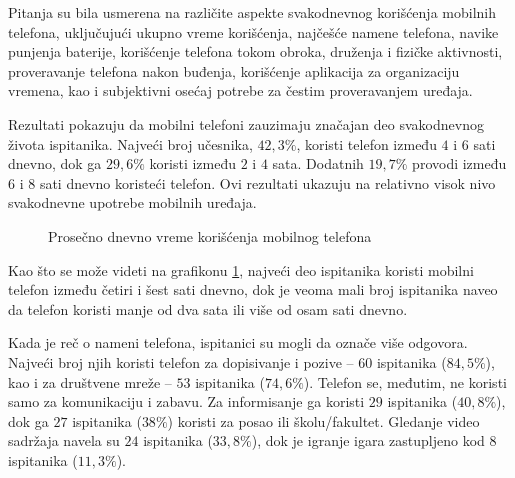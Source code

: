 \documentclass{article}
\begin{document}
Pitanja su bila usmerena na različite aspekte svakodnevnog korišćenja mobilnih telefona, uključujući ukupno vreme korišćenja, najčešće namene telefona, navike punjenja baterije, korišćenje telefona tokom obroka, druženja i fizičke aktivnosti, proveravanje telefona nakon buđenja, korišćenje aplikacija za organizaciju vremena, kao i subjektivni osećaj potrebe za čestim proveravanjem uređaja.

Rezultati pokazuju da mobilni telefoni zauzimaju značajan deo svakodnevnog života ispitanika. Najveći broj učesnika, $42{,}3\%$, koristi telefon između $4$ i $6$ sati dnevno, dok ga $29{,}6\%$ koristi između $2$ i $4$ sata. Dodatnih $19{,}7\%$ provodi između $6$ i $8$ sati dnevno koristeći telefon. Ovi rezultati ukazuju na relativno visok nivo svakodnevne upotrebe mobilnih uređaja.

\begin{figure}[ht]
\centering
{}
\caption{Prosečno dnevno vreme korišćenja mobilnog telefona}
\label{fig:vreme-koriscenja}
\end{figure}

Kao što se može videti na grafikonu \ref{fig:vreme-koriscenja}, najveći deo ispitanika koristi mobilni telefon između četiri i šest sati dnevno, dok je veoma mali broj ispitanika naveo da telefon koristi manje od dva sata ili više od osam sati dnevno.

Kada je reč o nameni telefona, ispitanici su mogli da označe više odgovora. Najveći broj njih koristi telefon za dopisivanje i pozive -- $60$ ispitanika ($84{,}5\%$), kao i za društvene mreže -- $53$ ispitanika ($74{,}6\%$). Telefon se, međutim, ne koristi samo za komunikaciju i zabavu. Za informisanje ga koristi $29$ ispitanika ($40{,}8\%$), dok ga $27$ ispitanika ($38\%$) koristi za posao ili školu/fakultet. Gledanje video sadržaja navela su $24$ ispitanika ($33{,}8\%$), dok je igranje igara zastupljeno kod $8$ ispitanika ($11{,}3\%$).
\end{document}
